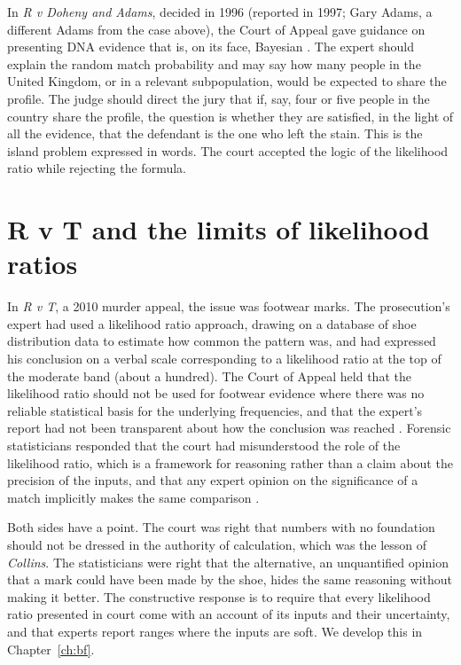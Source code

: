 In \emph{R v Doheny and Adams}, decided in 1996 (reported in 1997; Gary Adams, a different Adams from the case above), the Court of Appeal gave guidance on presenting DNA evidence that is, on its face, Bayesian \citep{doheny1997}. The expert should explain the random match probability and may say how many people in the United Kingdom, or in a relevant subpopulation, would be expected to share the profile. The judge should direct the jury that if, say, four or five people in the country share the profile, the question is whether they are satisfied, in the light of all the evidence, that the defendant is the one who left the stain. This is the island problem expressed in words. The court accepted the logic of the likelihood ratio while rejecting the formula.

\section{R v T and the limits of likelihood ratios}

In \emph{R v T}, a 2010 murder appeal, the issue was footwear marks. The prosecution's expert had used a likelihood ratio approach, drawing on a database of shoe distribution data to estimate how common the pattern was, and had expressed his conclusion on a verbal scale corresponding to a likelihood ratio at the top of the moderate band (about a hundred). The Court of Appeal held that the likelihood ratio should not be used for footwear evidence where there was no reliable statistical basis for the underlying frequencies, and that the expert's report had not been transparent about how the conclusion was reached \citep{rvt2010}. Forensic statisticians responded that the court had misunderstood the role of the likelihood ratio, which is a framework for reasoning rather than a claim about the precision of the inputs, and that any expert opinion on the significance of a match implicitly makes the same comparison \citep{berger2011}.

Both sides have a point. The court was right that numbers with no foundation should not be dressed in the authority of calculation, which was the lesson of \emph{Collins}. The statisticians were right that the alternative, an unquantified opinion that a mark could have been made by the shoe, hides the same reasoning without making it better. The constructive response is to require that every likelihood ratio presented in court come with an account of its inputs and their uncertainty, and that experts report ranges where the inputs are soft. We develop this in Chapter~\ref{ch:bf}.

